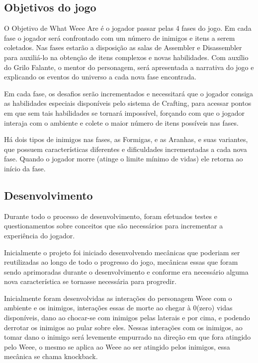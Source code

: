 \subsection{Objetivos do jogo}
O Objetivo de What Weee Are é o jogador passar pelas 4 fases do jogo. Em cada fase o jogador será confrontado com um número de inimigos e itens a serem coletados. Nas fases estarão a disposição as salas de Assembler e Disassembler para auxiliá-lo na obtenção de itens complexos e novas habilidades. Com auxílio do Grilo Falante, o mentor do personagem, será apresentada a narrativa do jogo e explicando os eventos do universo a cada nova fase encontrada. 

Em cada fase, os desafios serão incrementados e necessitará que o jogador consiga as habilidades especiais disponíveis pelo sistema de Crafting, para acessar pontos em que sem tais habilidades se tornará impossível, forçando com que o jogador interaja com o ambiente e colete o maior número de itens possíveis nas fases. 

Há dois tipos de inimigos nas fases, as Formigas, e as Aranhas, e suas variantes, que possuem características diferentes e dificuldades incrementadas a cada nova fase. Quando o jogador morre (atinge o limite mínimo de vidas) ele retorna ao início da fase.


\subsection{Desenvolvimento}
Durante todo o processo de desenvolvimento, foram efetuados testes e questionamentos sobre conceitos que são necessários para incrementar a experiência do jogador.

Inicialmente o projeto foi iniciado desenvolvendo mecânicas que poderiam ser reutilizadas ao longo de todo o progresso do jogo, mecânicas essas que foram sendo aprimoradas durante o desenvolvimento e conforme era necessário alguma nova característica se tornasse necessária para progredir. 

Inicialmente foram desenvolvidas as interações do personagem Weee com o ambiente e os inimigos, interações essas de morte ao chegar à 0(zero) vidas disponíveis, dano ao chocar-se com inimigos pelas laterais e por cima, e podendo derrotar os inimigos ao pular sobre eles. Nessas interações com os inimigos, ao tomar dano o inimigo será levemente empurrado na direção em que fora atingido pelo Weee, o mesmo se aplica ao Weee ao ser atingido pelos inimigos, essa mecânica se chama knockback.

